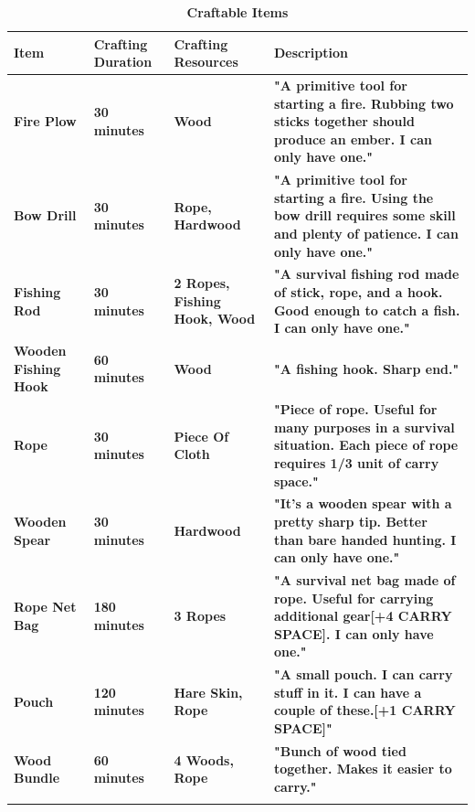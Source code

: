 		\begin{longtable}{|C{6em}|C{6em}|C{8em}|C{17em}|}
		   \toprule
		    \textcolor[rgb]{ 1,  1,  1}{\textbf{Item}} & \textcolor[rgb]{ 1,  1,  1}{\textbf{Crafting Duration}} & \textcolor[rgb]{ 1,  1,  1}{\textbf{Crafting Resources}} & \textcolor[rgb]{ 1,  1,  1}{\textbf{Description}} \\
		    \midrule
		     \textbf{Fire Plow} & \textbf{30 minutes} & \textbf{Wood} & \textbf{"A primitive tool for starting a fire. Rubbing two sticks together should produce an ember. I can only have one."} \\
		    \midrule
		     \textbf{Bow Drill} & \textbf{30 minutes} & \textbf{Rope, Hardwood} & \textbf{"A primitive tool for starting a fire. Using the bow drill requires some skill and plenty of patience. I can only have one."} \\
		    \midrule
		     \textbf{Fishing Rod} & \textbf{30 minutes} & \textbf{2 Ropes, Fishing Hook, Wood} & \textbf{"A survival fishing rod made of stick, rope, and a hook. Good enough to catch a fish. I can only have one."} \\
		    \midrule
		     \textbf{Wooden Fishing Hook} & \textbf{60 minutes} & \textbf{Wood} & \textbf{"A fishing hook. Sharp end."} \\
		    \midrule
		     \textbf{Rope} & \textbf{30 minutes} & \textbf{Piece Of Cloth} & \textbf{"Piece of rope. Useful for many purposes in a survival situation. Each piece of rope requires 1/3 unit of carry space."} \\
		    \midrule
		     \textbf{Wooden Spear} & \textbf{30 minutes} & \textbf{Hardwood} & \textbf{"It's a wooden spear with a pretty sharp tip. Better than bare handed hunting. I can only have one."} \\
		    \midrule
		     \textbf{Rope Net Bag} & \textbf{180 minutes} & \textbf{3 Ropes} & \textbf{"A survival net bag made of rope. Useful for carrying additional gear[+4 CARRY SPACE]. I can only have one."} \\
		    \midrule
		     \textbf{Pouch} & \textbf{120 minutes} & \textbf{Hare Skin, Rope} & \textbf{"A small pouch. I can carry stuff in it. I can have a couple of these.[+1 CARRY SPACE]"} \\
		    \midrule
		     \textbf{Wood Bundle} & \textbf{60 minutes} & \textbf{4 Woods, Rope} & \textbf{"Bunch of wood tied together. Makes it easier to carry."} \\
   		    \bottomrule	
		\caption{\textbf{Craftable Items}}
		\end{longtable}

